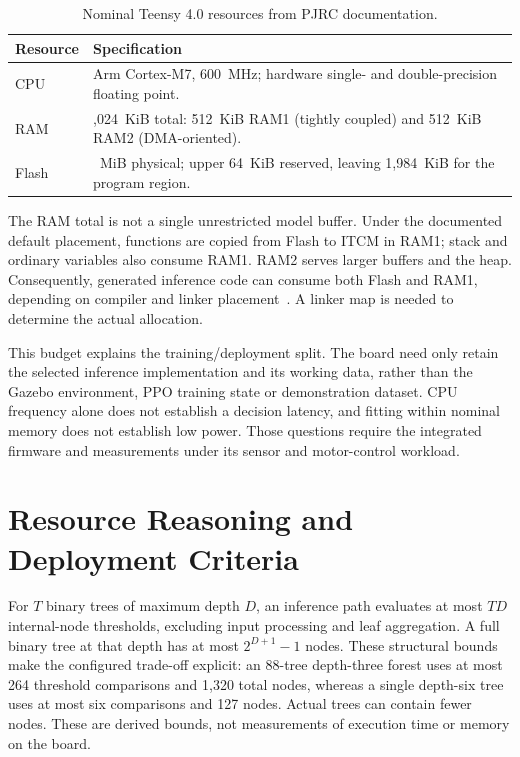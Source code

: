 \begin{table}[htbp]
\centering\small
\caption{Nominal Teensy 4.0 resources from PJRC documentation.}
\label{tab:teensy_resources}
\begin{tabularx}{\textwidth}{p{2.5cm}>{\raggedright\arraybackslash}X}
\toprule Resource & Specification \\
\midrule
CPU & Arm Cortex-M7, 600~MHz; hardware single- and double-precision floating point. \\
RAM & 1,024~KiB total: 512~KiB RAM1 (tightly coupled) and 512~KiB RAM2 (DMA-oriented). \\
Flash & 2~MiB physical; upper 64~KiB reserved, leaving 1,984~KiB for the program region. \\
\bottomrule
\end{tabularx}
\end{table}

The RAM total is not a single unrestricted model buffer. Under the documented
default placement, functions are copied from Flash to ITCM in RAM1; stack and
ordinary variables also consume RAM1. RAM2 serves larger buffers and the heap.
Consequently, generated inference code can consume both Flash and RAM1, depending
on compiler and linker placement~\cite{pjrcTeensy40}. A linker map is needed to
determine the actual allocation.

This budget explains the training/deployment split. The board need only retain
the selected inference implementation and its working data, rather than the
Gazebo environment, PPO training state or demonstration dataset. CPU frequency
alone does not establish a decision latency, and fitting within nominal memory
does not establish low power. Those questions require the integrated firmware
and measurements under its sensor and motor-control workload.

\section{Resource Reasoning and Deployment Criteria}
For $T$ binary trees of maximum depth $D$, an inference path evaluates at most
$TD$ internal-node thresholds, excluding input processing and leaf aggregation.
A full binary tree at that depth has at most $2^{D+1}-1$ nodes. These structural
bounds make the configured trade-off explicit: an 88-tree depth-three forest
uses at most 264 threshold comparisons and 1,320 total nodes, whereas a single
depth-six tree uses at most six comparisons and 127 nodes. Actual trees can
contain fewer nodes. These are derived bounds, not measurements of execution
time or memory on the board.

